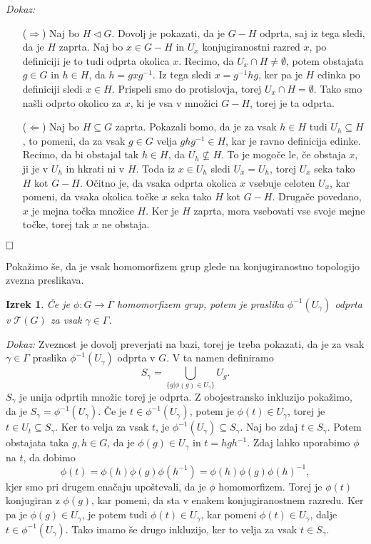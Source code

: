 \documentclass[a4paper,12pt]{article}
\def\qed{$\hfill\Box$}   %
\newtheorem{izrek}{Izrek}
\begin{document}
\noindent
{\em Dokaz:\/}
    \begin{itemize}
        \item[($\Rightarrow$)] Naj bo $H \triangleleft G$. Dovolj je pokazati, da je $G - H$ odprta, saj iz tega sledi, da je $H$ zaprta.
        Naj bo $x \in G - H$ in $U_x$ konjugiranostni razred $x$, po definiciji je to tudi odprta okolica $x$.
        Recimo, da $U_x \cap H \neq \emptyset$, potem obstajata $g \in G$ in $h \in H$, da $h = gxg^{-1}$.
        Iz tega sledi $x = g^{-1}hg$, ker pa je $H$ edinka po definiciji sledi $x \in H$. Prispeli smo do protislovja, torej $U_x \cap H = \emptyset$.
        Tako smo našli odprto okolico za $x$, ki je vsa v množici $G - H$, torej je ta odprta.
        \item[($\Leftarrow$)] Naj bo $H \subseteq G$ zaprta. Pokazali bomo, da je za vsak $h \in H$ tudi
        $U_h \subseteq H$, to pomeni, da za vsak $g \in G$ velja $ghg^{-1} \in H$, kar je ravno definicija edinke. Recimo, da bi obstajal tak $h \in H$,
        da $U_h \nsubseteq H$. To je mogoče le, če obstaja $x$, ji je v $U_h$ in hkrati ni v $H$. Toda iz $x \in U_h$ sledi $U_x = U_h$, torej $U_x$ seka tako $H$ kot $G - H$.
        Očitno je, da vsaka odprta okolica $x$ vsebuje celoten $U_x$, kar pomeni, da vsaka okolica točke $x$ seka tako $H$ kot $G - H$. Drugače povedano, $x$ je mejna točka množice $H$.
        Ker je $H$ zaprta, mora vsebovati vse svoje mejne točke, torej tak $x$ ne obstaja.
    \end{itemize} 
\qed

Pokažimo še, da je vsak homomorfizem grup glede na konjugiranostno topologijo zvezna preslikava.

\begin{izrek}
    Če je $\phi: G \rightarrow \Gamma$ homomorfizem grup, potem je praslika $\phi^{-1}(U_\gamma)$ odprta v $\mathcal{T}(G)$ za vsak $\gamma \in \Gamma$.
\end{izrek}

\noindent
{\em Dokaz:\/}
    Zveznost je dovolj preverjati na bazi, torej je treba pokazati, da je za vsak $\gamma \in \Gamma$ praslika $\phi^{-1}(U_\gamma)$ odprta v $G$.
    V ta namen definiramo
    \[ S_\gamma = \bigcup_{\{g | \phi(g) \in U_\gamma\}} U_g .\]
    $S_\gamma$ je unija odprtih množic torej je odprta. Z obojestransko inkluzijo pokažimo, da je $S_\gamma = \phi^{-1}(U_\gamma)$.
    Če je $t \in \phi^{-1}(U_\gamma)$, potem je $\phi(t) \in U_\gamma$, torej je $t \in U_t \subseteq S_\gamma$. Ker to velja za vsak $t$, je $\phi^{-1}(U_\gamma) \subseteq S_\gamma$.
    Naj bo zdaj $t \in S_\gamma$. Potem obstajata taka $g,h \in G$, da je $\phi(g) \in U_\gamma$ in $t = hgh^{-1}$. Zdaj lahko uporabimo $\phi$ na $t$, da dobimo
    \[\phi(t) = \phi(h)\phi(g)\phi(h^{-1}) = \phi(h)\phi(g)\phi(h)^{-1} ,\] kjer smo pri drugem enačaju upoštevali, da je $\phi$ homomorfizem.
    Torej je $\phi(t)$ konjugiran z $\phi(g)$, kar pomeni, da sta v enakem konjugiranostnem razredu. Ker pa je $\phi(g) \in U_\gamma$, je potem tudi $\phi(t) \in U_\gamma$,
    kar pomeni $\phi(t) \in U_\gamma$, dalje $t \in \phi^{-1}(U_\gamma)$. Tako imamo še drugo inkluzijo, ker to velja za vsak $t \in S_\gamma$.
\end{document}
